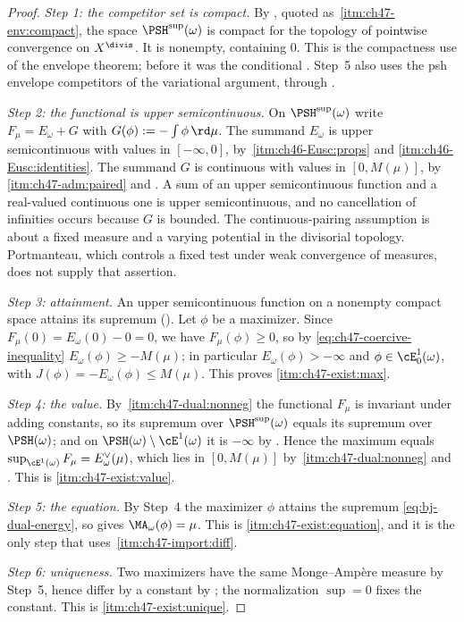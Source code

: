 \begin{proof}
\emph{Step 1: the competitor set is compact.}  By
, quoted as
\,\cref{itm:ch47-env:compact}, the space
$\PSH^{\sup}(\omega)$ is compact for the topology of pointwise
convergence on $X^{\divis}$.  It is nonempty, containing $0$.  This is
the compactness use of the envelope theorem; before
 it was the conditional
. Step~5 also uses the psh
envelope competitors of the variational argument, through
.

\emph{Step 2: the functional is upper semicontinuous.}  On
$\PSH^{\sup}(\omega)$ write $F_\mu=E_\omega+G$ with
$G(\phi):=-\int\phi\,\rd\mu$.  The summand $E_\omega$ is upper
semicontinuous with values in $[-\infty,0]$, by
\,\cref{itm:ch46-Eusc:props} and
\cref{itm:ch46-Eusc:identities}.  The summand $G$ is continuous with
values in $[0,M(\mu)]$, by
\,\cref{itm:ch47-adm:paired} and
.  A sum of an upper semicontinuous function and
a real-valued continuous one is upper semicontinuous, and no cancellation
of infinities occurs because $G$ is bounded.  The continuous-pairing assumption is about a fixed measure and a varying
potential in the divisorial topology. Portmanteau, which controls a fixed
test under weak convergence of measures, does not supply that assertion.

\emph{Step 3: attainment.}  An upper semicontinuous function on a nonempty
compact space attains its supremum ().  Let
$\phi$ be a maximizer.  Since $F_\mu(0)=E_\omega(0)-0=0$, we have
$F_\mu(\phi)\ge0$, so by \eqref{eq:ch47-coercive-inequality}
$E_\omega(\phi)\ge-M(\mu)$; in particular $E_\omega(\phi)>-\infty$ and
$\phi\in\cE^1_0(\omega)$, with $J(\phi)=-E_\omega(\phi)\le M(\mu)$.
This proves \cref{itm:ch47-exist:max}.

\emph{Step 4: the value.}  By
\,\cref{itm:ch47-dual:nonneg} the functional
$F_\mu$ is invariant under adding constants, so its supremum over
$\PSH^{\sup}(\omega)$ equals its supremum over
$\PSH(\omega)$; and on $\PSH(\omega)\setminus\cE^1(\omega)$ it is
$-\infty$ by .  Hence the maximum equals
$\sup_{\cE^1(\omega)}F_\mu=E^\vee_\omega(\mu)$, which lies in
$[0,M(\mu)]$ by
\,\cref{itm:ch47-dual:nonneg} and
.  This is \cref{itm:ch47-exist:value}.

\emph{Step 5: the equation.}  By Step~4 the maximizer $\phi$ attains the
supremum \eqref{eq:bj-dual-energy}, so
 gives $\MA_\omega(\phi)=\mu$.  This is
\cref{itm:ch47-exist:equation}, and it is the only step that uses
\,\cref{itm:ch47-import:diff}.

\emph{Step 6: uniqueness.}  Two maximizers have the same Monge--Amp\`ere
measure by Step~5, hence differ by a constant by
; the normalization $\sup=0$ fixes the
constant.  This is \cref{itm:ch47-exist:unique}.
\end{proof}

